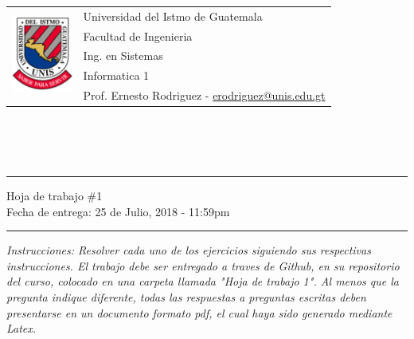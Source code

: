 \documentclass{article}
\newcommand{\horrule}[1]{\rule{\linewidth}{#1}}
\newcommand{\perlscript}[2]{
\begin{itemize}
\item[]
\end{itemize}
}
\begin{document}
\begin{tabular}{l l}
\multirow{5}{*}{\includegraphics[width=2cm]{../../recursos/logo.png}} & Universidad del Istmo de Guatemala \\
 & Facultad de Ingenieria \\
 & Ing. en Sistemas \\
 & Informatica 1 \\
 & Prof. Ernesto Rodriguez - \href{mailto:erodriguez@unis.edu.gt}{erodriguez@unis.edu.gt} \\
\end{tabular}
\\\\\\

\begin{center}
        \horrule{0.5pt}
        \huge{Hoja de trabajo \#1} \\
        \large{Fecha de entrega: 25 de Julio, 2018 - 11:59pm} \\
        \horrule{1pt}
\end{center}

\emph{Instrucciones: Resolver cada uno de los ejercicios siguiendo sus respectivas
instrucciones. El trabajo debe ser entregado a traves de Github, en su repositorio del curso, colocado en una carpeta llamada "Hoja de trabajo 1".
Al menos que la pregunta indique diferente, todas las respuestas a preguntas escritas deben presentarse en
un documento formato pdf, el cual haya sido generado mediante Latex. }

\end{document}
